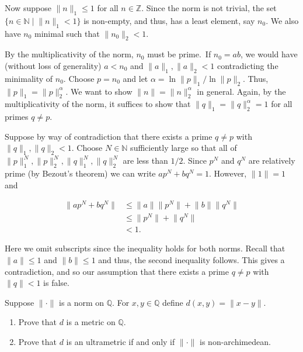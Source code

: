 \documentclass[12 pt, letterpaper]{hmcpset}
\begin{document}
\begin{solution}
	Now suppose $\lVert n \rVert_{1} \leq 1$ for all $n \in \mathbb{Z}$. Since the norm is not trivial, the set $\{ n \in \mathbb{N} \mid \lVert n \rVert_{1} < 1 \}$ is non-empty, and thus, has a least element, say $n_{0}$. We also have $n_{0}$ minimal such that $\lVert n_{0} \rVert_{2} < 1$. 

	By the multiplicativity of the norm, $n_{0}$ must be prime. If $n_{0} = ab$, we would have (without loss of generality) $a < n_{0}$ and $\lVert a \rVert_{1}, \lVert a \rVert_{2} < 1$ contradicting the minimality of $n_{0}$. Choose $p = n_{0}$ and let $\alpha = \ln \lVert p \rVert_{1}  / \ln \lVert p \rVert_{2}$. Thus, $\lVert p \rVert_{1} = \lVert p \rVert_{2}^\alpha$. We want to show $\lVert n \rVert = \lVert n \lVert_{2}^\alpha$ in general. Again, by the multiplicativity of the norm, it suffices to show that $\lVert q \rVert_{1} = \lVert q \rVert_{2}^\alpha = 1$ for all primes $q \neq p$.

Suppose by way of contradiction that there exists a prime $q \neq p$ with $\lVert q \rVert_{1}, \lVert q \rVert_{2} < 1$. Choose $N \in \mathbb{N}$ sufficiently large so that all of $\lVert p \rVert_{1}^{N}, \lVert p \rVert_{2}^{N}, \lVert q \rVert_{1}^{N}, \lVert q \rVert_{2}^{N}$ are less than $1 / 2$. Since $p^N$ and $q^N$ are relatively prime (by Bezout's theorem) we can write $a p^N + b q^N = 1$. However, $\lVert 1 \rVert = 1$ and

\begin{align*}
\lVert a p^N + b q^N \rVert & \leq \lVert a \rVert  \lVert p^N \rVert  + \lVert b \rVert  \lVert q^N \rVert  \\
 & \leq \lVert p^N \rVert + \lVert q^N \rVert  \\
 & < 1.
\end{align*}

Here we omit subscripts since the inequality holds for both norms. Recall that $\lVert a \rVert \leq 1$ and $\lVert b \rVert \leq 1$ and thus, the second inequality follows. This gives a contradiction, and so our assumption that there exists a prime $q \neq p$ with $\lVert q \rVert < 1$ is false.
\end{solution}

\pagebreak

\begin{problem}[(5)]
	Suppose $\lVert \cdot \rVert$ is a norm on $\mathbb{Q}$. For $x, y \in \mathbb{Q}$ define $d(x, y) = \lVert x - y \rVert$.
	\begin{enumerate}
		\item Prove that $d$ is a metric on $\mathbb{Q}$.
		\item Prove that $d$ is an ultrametric if and only if $\lVert \cdot \rVert$ is non-archimedean.
	\end{enumerate}
\end{problem}
\end{document}
